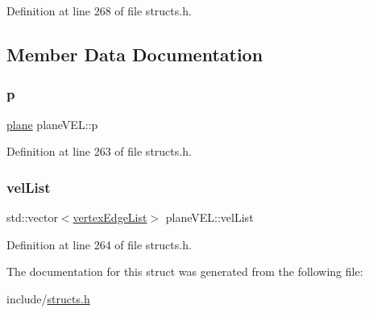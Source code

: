 Definition at line 268 of file structs.\+h.



\subsection{Member Data Documentation}
\mbox{\label{structplane_v_e_l_a8ea259111525aaae0eb47c16ee2b1294}} 
\subsubsection{\texorpdfstring{p}{p}}
{\footnotesize\ttfamily \mbox{\hyperlink{structplane}{plane}} plane\+V\+E\+L\+::p}



Definition at line 263 of file structs.\+h.

\mbox{\label{structplane_v_e_l_af46afbe3061e68d08132aec85b94deb8}} 
\subsubsection{\texorpdfstring{vel\+List}{velList}}
{\footnotesize\ttfamily std\+::vector$<$\mbox{\hyperlink{structvertex_edge_list}{vertex\+Edge\+List}}$>$ plane\+V\+E\+L\+::vel\+List}



Definition at line 264 of file structs.\+h.



The documentation for this struct was generated from the following file\+:\begin{DoxyCompactItemize}
\item 
include/\mbox{\hyperlink{structs_8h}{structs.\+h}}\end{DoxyCompactItemize}
